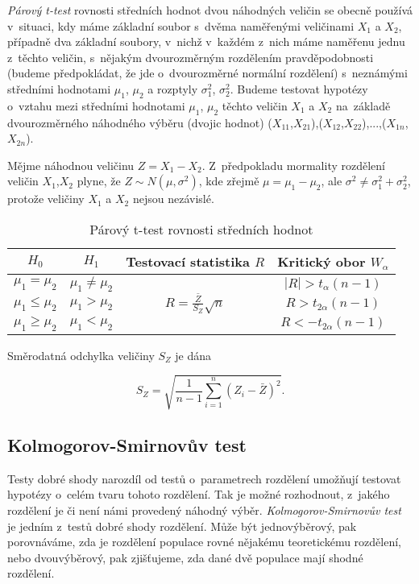 \documentclass[thesis=B,czech]{FITthesis}[2012/06/26]
\begin{document}
\textit{Párový t-test} rovnosti středních hodnot dvou náhodných veličin se obecně používá v~situaci, kdy máme základní soubor s~dvěma naměřenými veličinami $X_{1}$ a $X_{2}$, případně dva  základní soubory, v~nichž v~každém z~nich máme naměřenu jednu z~těchto veličin, s~nějakým dvourozměrným rozdělením pravděpodobnosti (budeme předpokládat, že jde o~dvourozměrné normální rozdělení) s~neznámými středními hodnotami $\mu_{1}$, $\mu_{2}$ a rozptyly $\sigma^{2}_{1}$, $\sigma^{2}_{2}$. Budeme testovat hypotézy o~vztahu mezi středními hodnotami $\mu_{1}$, $\mu_{2}$ těchto veličin $X_{1}$ a $X_{2}$ na~základě dvourozměrného náhodného výběru (dvojic hodnot) ($X_{11}$,$X_{21}$),($X_{12}$,$X_{22}$),...,($X_{1n}$,$X_{2n}$).

Mějme náhodnou veličinu $Z=X_{1}-X_{2}$. Z~předpokladu mormality rozdělení veličin $X_{1}$,$X_{2}$ plyne, že $Z\sim N(\mu,\sigma^2)$, kde zřejmě $\mu=\mu_{1}-\mu_{2}$, ale $\sigma^{2}\neq\sigma^{2}_{1}+\sigma^{2}_{2}$, protože veličiny $X_{1}$ a $X_{2}$ nejsou nezávislé. 

\begin{table}[ht] \centering
\caption{Párový t-test rovnosti středních hodnot \cite[tab. 9.3.7]{VŠCHT}}
\label{tab:Párový t-test rovnosti středních hodnot}
\begin{tabular}{|c|c|c|c|}
\hline
 $H_{0}$ & $H_{1}$ & Testovací statistika $R$ & Kritický obor $W_{\alpha}$  \\ \hline
 $\mu_{1}=\mu_{2}$ & $\mu_{1}\neq\mu_{2}$ & 
 \multirow{3}{*}{$R=\frac{\bar{Z}}{S_{Z}}\sqrt{n}$}  & 
 $\left | R \right |> \mathit{t}_{\alpha}(n-1)$   \\
 $\mu_{1}\leq\mu_{2}$ & $\mu_{1}>\mu_{2}$ &  &  $R > \mathit{t}_{2\alpha}(n-1)$   \\
$\mu_{1}\geq\mu_{2}$ & $\mu_{1}<\mu_{2}$ &  & $R < - \mathit{t}_{2\alpha}(n-1)$ \\ \hline
\end{tabular}
\end{table}

\noindent Směrodatná odchylka veličiny $S_{Z}$ je dána

$$S_{Z}=\sqrt{\frac{1}{n-1}\sum^{n}_{i=1}(Z_{i}-\bar{Z})^2}.$$

\subsection{Kolmogorov-Smirnovův test}
Testy dobré shody narozdíl od testů o~parametrech rozdělení umožňují testovat hypotézy o~celém tvaru tohoto rozdělení. Tak je možné rozhodnout, z~jakého rozdělení je či není námi provedený náhodný výběr. \textit{Kolmogorov-Smirnovův test} je jedním z~testů dobré shody rozdělení. Může být jednovýběrový, pak porovnáváme, zda je rozdělení populace rovné nějakému teoretickému rozdělení, nebo dvouvýběrový, pak zjišťujeme, zda dané dvě populace mají shodné rozdělení. 
\end{document}
